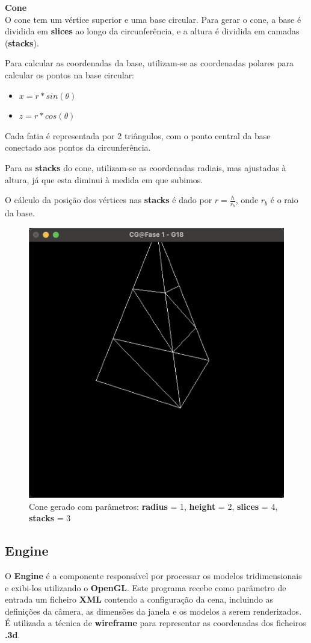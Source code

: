 \documentclass[12pt,a4paper]{report}%
\begin{document}
\textbf{Cone} \\

O cone tem um vértice superior e uma base circular. Para gerar o cone, a base é dividida em \textbf{slices} ao longo da circunferência, e a altura é dividida em camadas (\textbf{stacks}).

Para calcular as coordenadas da base, utilizam-se as coordenadas polares para calcular os pontos na base circular: 
\begin{itemize}
    \item \(x=r*sin(\theta)\)
    \item \(z = r*cos(\theta)\)
\end{itemize}
Cada fatia é representada por 2 triângulos, com o ponto central da base conectado aos pontos da circunferência.

Para as \textbf{stacks} do cone, utilizam-se as coordenadas radiais, mas ajustadas à altura, já que esta diminui à medida em que subimos. 

O cálculo da posição dos vértices nas \textbf{stacks} é dado por \(r=\frac{h}{r_b}\), onde \(r_b\) é o raio da base.
\begin{figure} [H]
    \centering
    \includegraphics[width=0.5\linewidth]{images/cone_1_2_4_3.png}
    \caption{Cone gerado com parâmetros: \textbf{radius} = 1, \textbf{height} = 2, \textbf{slices} = 4, \textbf{stacks} = 3}
    \label{fig:cone-1243}
\end{figure}


\subsection{Engine}
O \textbf{Engine} é a componente responsável por processar os modelos tridimensionais e exibi-los utilizando o \textbf{OpenGL}. Este programa recebe como parâmetro de entrada um ficheiro \textbf{XML} contendo a configuração da cena, incluindo as definições da câmera, as dimensões da janela e os modelos a serem renderizados. É utilizada a técnica de \textbf{wireframe} para representar as coordenadas dos ficheiros \textbf{.3d}. 
\end{document}
